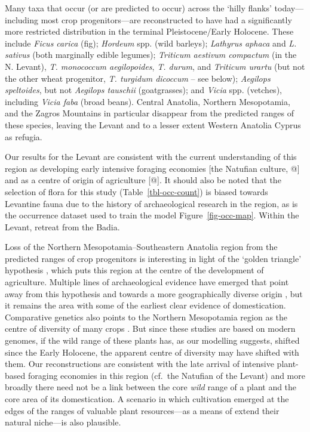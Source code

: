 \documentclass[
  authoryear,
  review]{elsarticle}
\begin{document}
Many taxa that occur (or are predicted to occur) across the `hilly
flanks' today---including most crop progenitors---are reconstructed to
have had a significantly more restricted distribution in the terminal
Pleistocene/Early Holocene. These include \emph{Ficus carica} (fig);
\emph{Hordeum} spp. (wild barleys); \emph{Lathyrus aphaca} and \emph{L.
sativus} (both marginally edible legumes); \emph{Triticum aestivum
compactum} (in the N. Levant), \emph{T. monococcum aegilopoides},
\emph{T. durum}, and \emph{Triticum urartu} (but not the other wheat
progenitor, \emph{T. turgidum dicoccum} -- see below); \emph{Aegilops
speltoides}, but not \emph{Aegilops tauschii} (goatgrasses); and
\emph{Vicia} spp. (vetches), including \emph{Vicia faba} (broad beans).
Central Anatolia, Northern Mesopotamia, and the Zagros Mountains in
particular disappear from the predicted ranges of these species, leaving
the Levant and to a lesser extent Western Anatolia Cyprus as refugia.

Our results for the Levant are consistent with the current understanding
of this region as developing early intensive foraging economies {[}the
Natufian culture, @{]} and as a centre of origin of agriculture {[}@{]}.
It should also be noted that the selection of flora for this study
(Table~\ref{tbl-occ-count}) is biased towards Levantine fauna due to the
history of archaeological research in the region, as is the occurrence
dataset used to train the model Figure~\ref{fig-occ-map}. Within the
Levant, retreat from the Badia.

Loss of the Northern Mesopotamia--Southeastern Anatolia region from the
predicted ranges of crop progenitors is interesting in light of the
`golden triangle' hypothesis \citep{KozlowskiAurenche2005}, which puts
this region at the centre of the development of agriculture. Multiple
lines of archaeological evidence have emerged that point away from this
hypothesis and towards a more geographically diverse origin
\citep{Asouti2006, cites}, but it remains the area with some of the
earliest clear evidence of domestication. Comparative genetics also
points to the Northern Mesopotamia region as the centre of diversity of
many crops \citep{cite}. But since these studies are based on modern
genomes, if the wild range of these plants has, as our modelling
suggests, shifted since the Early Holocene, the apparent centre of
diversity may have shifted with them. Our reconstructions are consistent
with the late arrival of intensive plant-based foraging economies in
this region (cf.~the Natufian of the Levant) and more broadly there need
not be a link between the core \emph{wild} range of a plant and the core
area of its domestication. A scenario in which cultivation emerged at
the edges of the ranges of valuable plant resources---as a means of
extend their natural niche---is also plausible.
\end{document}
